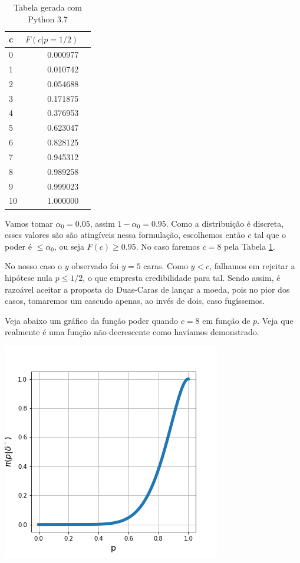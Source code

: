 \documentclass[a4paper,10pt, notitlepage]{report}
\begin{document}
\begin{enumerate}
\begin{table}[!htb]
\begin{center}
		\begin{tabular}{lrr}
			\toprule
			{c} &     $F(c|p=1/2)$ \\
			\midrule
			0  &     0.000977 \\
			1  &    0.010742 \\
			2  &      0.054688 \\
			3  &     0.171875 \\
			4  &     0.376953 \\
			5  &     0.623047 \\
			6  &     0.828125 \\
			7  &     0.945312 \\
			8  &     0.989258 \\
			9  &     0.999023 \\
			10 &     1.000000 \\
			\bottomrule
		\end{tabular}
	
	\caption{Tabela gerada com Python 3.7}
		\label{tabela}
	\end{center}
	\end{table}
		
		
	Vamos tomar $\alpha_0=0.05$, assim $1-\alpha_0=0.95$. Como a distribuição é discreta, esses valores são são atingíveis nessa formulação, escolhemos então $c$ tal que o poder é $\leq\alpha_0$, ou seja $F(c)\geq 0.95$. No caso faremos $c=8$ pela Tabela \ref{tabela}.
	
	No nosso caso o $y$ observado foi $y=5$ caras. Como $y<c$, falhamos em rejeitar a hipótese nula $p\leq 1/2$, o que empresta credibilidade para tal. Sendo assim, é razoável aceitar a proposta do Duas-Caras de lançar a moeda, pois no pior dos casos, tomaremos um cascudo apenas, ao invés de dois, caso fugíssemos.
	
	Veja abaixo um gráfico da função poder quando $c=8$ em função de $p$. Veja que realmente é uma função não-decrescente como havíamos demonstrado.
	
	\begin{center}
		\includegraphics[scale=1]{power.png}
	\end{center}
	
	
\end{enumerate}
	
\end{document}
